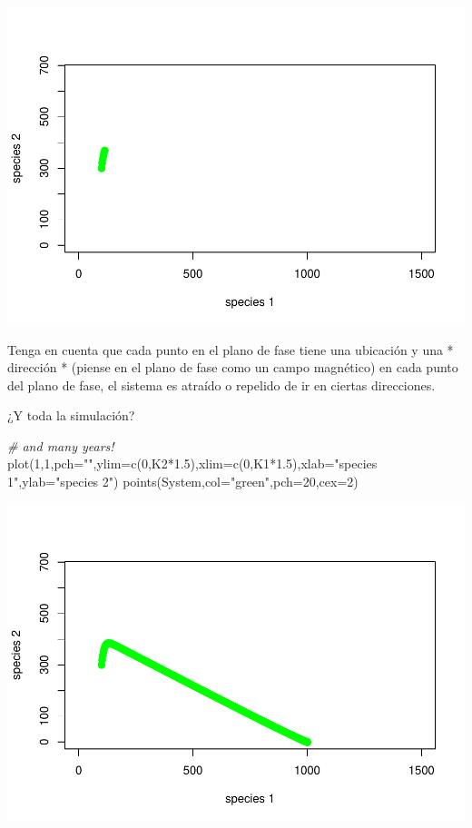 \documentclass[
]{article}
\newenvironment{Shaded}{\begin{snugshade}}{\end{snugshade}}
\newcommand{\AttributeTok}[1]{\textcolor[rgb]{0.77,0.63,0.00}{#1}}
\newcommand{\CommentTok}[1]{\textcolor[rgb]{0.56,0.35,0.01}{\textit{#1}}}
\newcommand{\DecValTok}[1]{\textcolor[rgb]{0.00,0.00,0.81}{#1}}
\newcommand{\FloatTok}[1]{\textcolor[rgb]{0.00,0.00,0.81}{#1}}
\newcommand{\FunctionTok}[1]{\textcolor[rgb]{0.00,0.00,0.00}{#1}}
\newcommand{\NormalTok}[1]{#1}
\newcommand{\SpecialCharTok}[1]{\textcolor[rgb]{0.00,0.00,0.00}{#1}}
\newcommand{\StringTok}[1]{\textcolor[rgb]{0.31,0.60,0.02}{#1}}
\begin{document}
\includegraphics{LECTURE16_files/figure-latex/unnamed-chunk-4-1.pdf}

Tenga en cuenta que cada punto en el plano de fase tiene una ubicación y
una * dirección * (piense en el plano de fase como un campo magnético)
en cada punto del plano de fase, el sistema es atraído o repelido de ir
en ciertas direcciones.

¿Y toda la simulación?

\begin{Shaded}
\begin{Highlighting}[]
\CommentTok{\# and many years!}
\FunctionTok{plot}\NormalTok{(}\DecValTok{1}\NormalTok{,}\DecValTok{1}\NormalTok{,}\AttributeTok{pch=}\StringTok{""}\NormalTok{,}\AttributeTok{ylim=}\FunctionTok{c}\NormalTok{(}\DecValTok{0}\NormalTok{,K2}\SpecialCharTok{*}\FloatTok{1.5}\NormalTok{),}\AttributeTok{xlim=}\FunctionTok{c}\NormalTok{(}\DecValTok{0}\NormalTok{,K1}\SpecialCharTok{*}\FloatTok{1.5}\NormalTok{),}\AttributeTok{xlab=}\StringTok{"species 1"}\NormalTok{,}\AttributeTok{ylab=}\StringTok{"species 2"}\NormalTok{)}
\FunctionTok{points}\NormalTok{(System,}\AttributeTok{col=}\StringTok{"green"}\NormalTok{,}\AttributeTok{pch=}\DecValTok{20}\NormalTok{,}\AttributeTok{cex=}\DecValTok{2}\NormalTok{)}
\end{Highlighting}
\end{Shaded}

\includegraphics{LECTURE16_files/figure-latex/unnamed-chunk-5-1.pdf}
\end{document}
